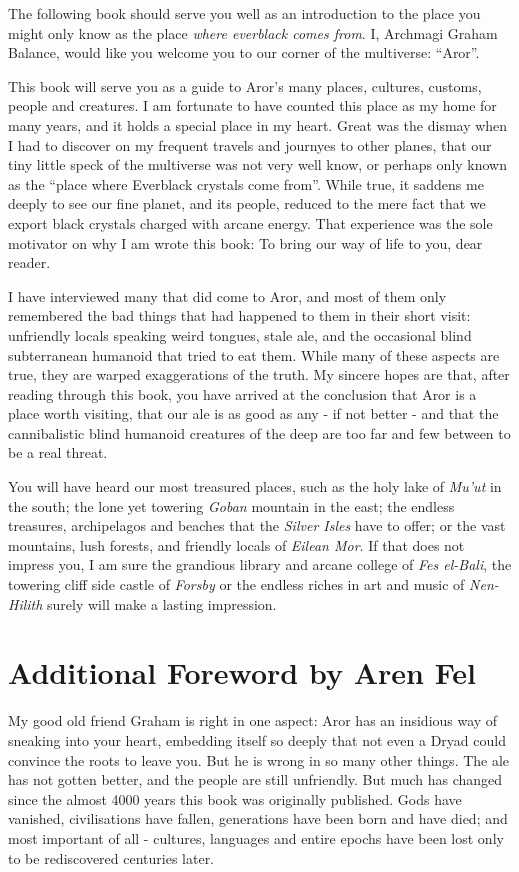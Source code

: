 The following book should serve you well as an introduction to the
place you might only know as the place \emph{where everblack comes
  from}. I, Archmagi Graham Balance, would like you welcome you to
our corner of the multiverse: ``Aror''.

This book will serve you as a guide to Aror's many places, cultures,
customs, people and creatures. I am fortunate to have counted this
place as my home for many years, and it holds a special place in my
heart. Great was the dismay when I had to discover on my frequent
travels and journyes to other planes, that our tiny little speck of
the multiverse was not very well know, or perhaps only known as the
``place where Everblack crystals come from''. While true, it saddens
me deeply to see our fine planet, and its people, reduced to the mere
fact that we export black crystals charged with arcane energy. That
experience was the sole motivator on why I am wrote this book: To bring
our way of life to you, dear reader.

I have interviewed many that did come to Aror, and most of them only
remembered the bad things that had happened to them in their short
visit: unfriendly locals speaking weird tongues, stale ale, and the
occasional blind subterranean humanoid that tried to eat them. While
many of these aspects are true, they are warped exaggerations of the
truth. My sincere hopes are that, after reading through this book, you
have arrived at the conclusion that Aror is a place worth visiting,
that our ale is as good as any - if not better - and that the
cannibalistic blind humanoid creatures of the deep are too far and few
between to be a real threat.

You will have heard our most treasured places, such as the holy lake
of \emph{Mu'ut} in the south; the lone yet towering \emph{Goban}
mountain in the east; the endless treasures, archipelagos and beaches
that the \emph{Silver Isles} have to offer; or the vast mountains,
lush forests, and friendly locals of \emph{Eilean Mor}. If that does
not impress you, I am sure the grandious library and arcane college of
\emph{Fes el-Bali}, the towering cliff side castle of \emph{Forsby} or
the endless riches in art and music of \emph{Nen-Hilith} surely will
make a lasting impression.

\section*{Additional Foreword by Aren Fel}

My good old friend Graham is right in one aspect: Aror has an insidious
way of sneaking into your heart, embedding itself so deeply that not
even a Dryad could convince the roots to leave you. But he is wrong in
so many other things. The ale has not gotten better, and the people
are still unfriendly. But much has changed since the almost 4000 years
this book was originally published. Gods have vanished, civilisations
have fallen, generations have been born and have died; and most important
of all - cultures, languages and entire epochs have been lost only to be
rediscovered centuries later.


